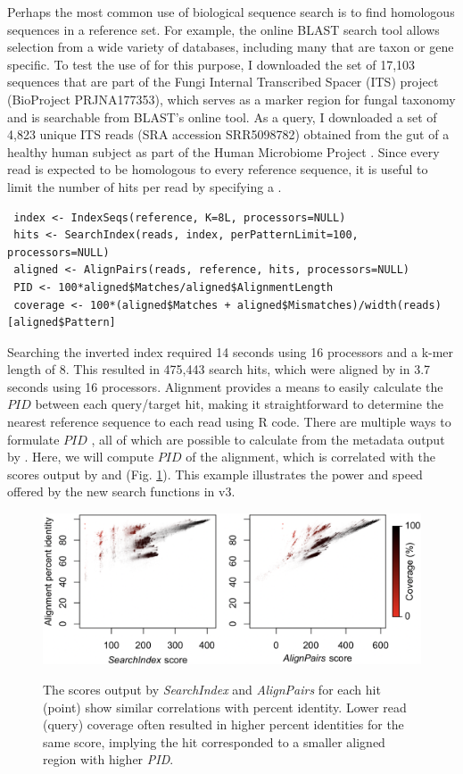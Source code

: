 Perhaps the most common use of biological sequence search is to find homologous sequences in a reference set. For example, the online BLAST search tool allows selection from a wide variety of databases, including many that are taxon or gene specific. To test the use of  for this purpose, I downloaded the set of 17,103 sequences that are part of the Fungi Internal Transcribed Spacer (ITS) project (BioProject PRJNA177353), which serves as a marker region for fungal taxonomy \citep{RN4289} and is searchable from BLAST's online tool. As a query, I downloaded a set of 4,823 unique ITS reads (SRA accession SRR5098782) obtained from the gut of a healthy human subject as part of the Human Microbiome Project \citep{RN4288}. Since every read is expected to be homologous to every reference sequence, it is useful to limit the number of hits per read by specifying a .

\begin{verbatim}
 index <- IndexSeqs(reference, K=8L, processors=NULL)
 hits <- SearchIndex(reads, index, perPatternLimit=100, processors=NULL)
 aligned <- AlignPairs(reads, reference, hits, processors=NULL)
 PID <- 100*aligned$Matches/aligned$AlignmentLength
 coverage <- 100*(aligned$Matches + aligned$Mismatches)/width(reads)[aligned$Pattern]
\end{verbatim}

Searching the inverted index required 14 seconds using 16 processors and a k-mer length of 8. This resulted in 475,443 search hits, which were aligned by  in 3.7 seconds using 16 processors. Alignment provides a means to easily calculate the \(PID\) between each query/target hit, making it straightforward to determine the nearest reference sequence to each read using R code. There are multiple ways to formulate \(PID\) \citep{RN4290}, all of which are possible to calculate from the metadata output by . Here, we will compute \(PID\) of the alignment, which is correlated with the scores output by  and  (Fig. \ref{fig:fig4}). This example illustrates the power and speed offered by the new search functions in  v3.

\begin{figure}
\includegraphics[width=1\linewidth,alt={}]{figures/Fig4} \caption{The scores output by \textit{SearchIndex} and \textit{AlignPairs} for each hit (point) show similar correlations with percent identity. Lower read (query) coverage often resulted in higher percent identities for the same score, implying the hit corresponded to a smaller aligned region with higher \textit{PID}.}\label{fig:fig4}
\end{figure}

